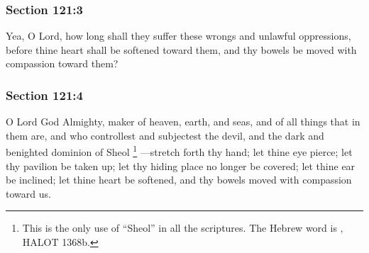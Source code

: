 
	\subsubsection{Section 121:3} %
		\label{DC121-3}

		Yea, O Lord, how long shall they suffer these wrongs and unlawful oppressions, before thine heart shall be softened toward them, and thy bowels be moved with compassion toward them?


	\subsubsection{Section 121:4} %
		\label{DC121-4}

		O Lord God Almighty, maker of heaven, earth, and seas, and of all things that in them are, and who controllest and subjectest the devil, and the dark and benighted dominion of Sheol%
			\footnote{%
				This is the only use of ``Sheol'' in all the scriptures. The Hebrew word is , HALOT 1368b.
				}%
		---stretch forth thy hand; let thine eye pierce; let thy pavilion be taken up; let thy hiding place no longer be covered; let thine ear be inclined; let thine heart be softened, and thy bowels moved with compassion toward us.


